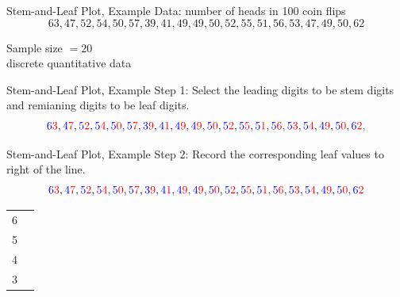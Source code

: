 \documentclass{beamer}
\newcommand{\blue}[1]{{\color{blue} #1}}
\newcommand{\red}[1]{{\color{red} #1}}
\newcommand{\bluRed}[2]{{\color{blue} #1}{\color{red} #2}}
\begin{document}
\begin{frame}{Stem-and-Leaf Plot, Example}
    Data: number of heads in 100 coin flips
    \[63,47,52,54,50,
        57,39,41,49,49,
        50, 52, 55, 51, 56,
        53, 47, 49, 50, 62 \]
    \begin{center}
        Sample size $= 20$\\
        discrete quantitative data
    \end{center}
\end{frame}

\begin{frame}{Stem-and-Leaf Plot, Example}
    Step 1: Select the \blue{leading} digits to be \blue{stem} digits and \red{remianing} digits to be \red{leaf} digits.
    \[\bluRed{6}{3},
        \bluRed{4}{7},
        \bluRed{5}{2},
        \bluRed{5}{4},
        \bluRed{5}{0},
        \bluRed{5}{7},
        \bluRed{3}{9},
        \bluRed{4}{1},
        \bluRed{4}{9},
        \bluRed{4}{9},
        \bluRed{5}{0},
        \bluRed{5}{2},
        \bluRed{5}{5},
        \bluRed{5}{1},
        \bluRed{5}{6},
        \bluRed{5}{3},
        \bluRed{5}{4},
        \bluRed{4}{9},
        \bluRed{5}{0},
        \bluRed{6}{2}, \]
\end{frame}

\begin{frame}{Stem-and-Leaf Plot, Example}
    Step 2: Record the corresponding \red{leaf} values to right of the line.
    \[\bluRed{6}{3},
        \bluRed{4}{7},
        \bluRed{5}{2},
        \bluRed{5}{4},
        \bluRed{5}{0},
        \bluRed{5}{7},
        \bluRed{3}{9},
        \bluRed{4}{1},
        \bluRed{4}{9},
        \bluRed{4}{9},
        \bluRed{5}{0},
        \bluRed{5}{2},
        \bluRed{5}{5},
        \bluRed{5}{1},
        \bluRed{5}{6},
        \bluRed{5}{3},
        \bluRed{5}{4},
        \bluRed{4}{9},
        \bluRed{5}{0},
        \bluRed{6}{2}\]
    \begin{table}
        \begin{tabular}{r | l}
            \blue{6} & \\
            \blue{5} & \\
            \blue{4} & \\
            \blue{3} & \\
        \end{tabular}
    \end{table}
\end{frame}
\end{document}
